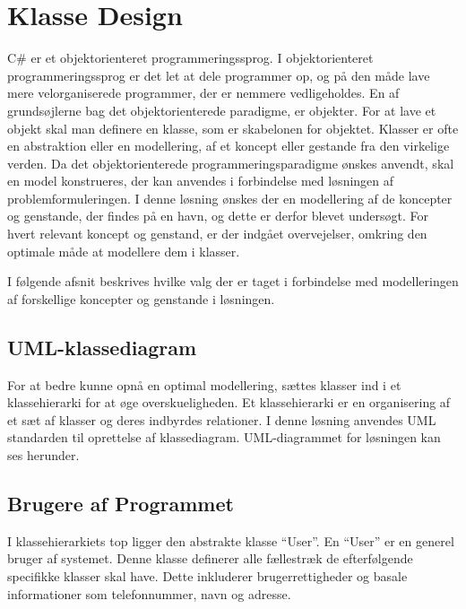 \section{Klasse Design}
\label{sec:klasse_design}
C\# er et objektorienteret programmeringssprog. I objektorienteret programmeringssprog er det let at dele programmer op, og på den måde lave mere velorganiserede programmer, der er nemmere vedligeholdes. En af grundsøjlerne bag det objektorienterede paradigme, er objekter. For at lave et objekt skal man definere en klasse, som er skabelonen for objektet. Klasser er ofte en abstraktion eller en modellering, af et koncept eller gestande fra den virkelige verden. Da det objektorienterede programmeringsparadigme ønskes anvendt, skal en model konstrueres, der kan anvendes i forbindelse med løsningen af problemformuleringen. I denne løsning ønskes der en modellering af de koncepter og genstande, der findes på en havn, og dette er derfor blevet undersøgt. For hvert relevant koncept og genstand, er der indgået overvejelser, omkring den optimale måde at modellere dem i klasser.

I følgende afsnit beskrives hvilke valg der er taget i forbindelse med modelleringen af forskellige koncepter og genstande i løsningen. 

\subsection{UML-klassediagram}

For at bedre kunne opnå en optimal modellering, sættes klasser ind i et klassehierarki for at øge overskueligheden. Et klassehierarki er en organisering af et sæt af klasser og deres indbyrdes relationer. I denne løsning anvendes UML standarden til oprettelse af klassediagram. UML-diagrammet for løsningen kan ses herunder.



\subsection{Brugere af Programmet}
\label{sub:brugere_af_programmet}

I klassehierarkiets top ligger den abstrakte klasse \enquote{User}. En \enquote{User} er en generel bruger af systemet. Denne klasse definerer alle fællestræk de efterfølgende specifikke klasser skal have. Dette inkluderer brugerrettigheder og basale informationer som telefonnummer, navn og adresse.

